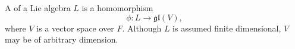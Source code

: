 A  of a Lie algebra $L$ is a homomorphism
$$\phi: L \rightarrow \mathfrak{gl}(V),$$
where $V$ is a vector space over $F$. Although $L$ is assumed finite dimensional, $V$ may be of arbitrary dimension.
